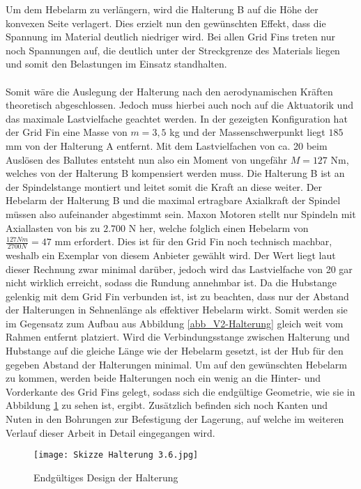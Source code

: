 Um dem Hebelarm zu verlängern, wird die Halterung B auf die Höhe der konvexen Seite verlagert. Dies erzielt nun den gewünschten Effekt, dass die Spannung im Material deutlich niedriger wird. Bei allen Grid Fins treten nur noch Spannungen auf, die deutlich unter der Streckgrenze des Materials liegen und somit den Belastungen im Einsatz standhalten.
\\~\\
Somit wäre die Auslegung der Halterung nach den aerodynamischen Kräften theoretisch abgeschlossen. Jedoch muss hierbei auch noch auf die Aktuatorik und das maximale Lastvielfache geachtet werden. In der gezeigten Konfiguration hat der Grid Fin eine Masse von $m = 3,5$ kg und der Massenschwerpunkt liegt $185$ mm von der Halterung A entfernt. Mit dem Lastvielfachen von ca. 20 beim Auslösen des Ballutes entsteht nun also ein Moment von ungefähr $M=127$ Nm, welches von der Halterung B kompensiert werden muss. Die Halterung B ist an der Spindelstange montiert und leitet somit die Kraft an diese weiter. Der Hebelarm der Halterung B und die maximal ertragbare Axialkraft der Spindel müssen also aufeinander abgestimmt sein. Maxon Motoren stellt nur Spindeln mit Axiallasten von bis zu $2.700$ N her, welche folglich einen Hebelarm von $\frac{127Nm}{2700N}=47$ mm erfordert. Dies ist für den Grid Fin noch technisch machbar, weshalb ein Exemplar von diesem Anbieter gewählt wird. Der Wert liegt laut dieser Rechnung zwar minimal darüber, jedoch wird das Lastvielfache von 20 gar nicht wirklich erreicht, sodass die Rundung annehmbar ist. Da die Hubstange gelenkig mit dem Grid Fin verbunden ist, ist zu beachten, dass nur der Abstand der Halterungen in Sehnenlänge als effektiver Hebelarm wirkt. Somit werden sie im Gegensatz zum Aufbau aus Abbildung \ref{abb_V2-Halterung} gleich weit vom Rahmen entfernt platziert. Wird die Verbindungsstange zwischen Halterung und Hubstange auf die gleiche Länge wie der Hebelarm gesetzt, ist der Hub für den gegeben Abstand der Halterungen minimal. Um auf den gewünschten Hebelarm zu kommen, werden beide Halterungen noch ein wenig an die Hinter- und Vorderkante des Grid Fins gelegt, sodass sich die endgültige Geometrie, wie sie in Abbildung \ref{abb_Halterung-fertig} zu sehen ist, ergibt. Zusätzlich befinden sich noch Kanten und Nuten in den Bohrungen zur Befestigung der Lagerung, auf welche im weiteren Verlauf dieser Arbeit in Detail eingegangen wird.
\begin{figure}[h] 
	\centering
	\texttt{[image: Skizze Halterung 3.6.jpg]}
	\caption{Endgültiges Design der Halterung}
	\label{abb_Halterung-fertig}
\end{figure}\\
